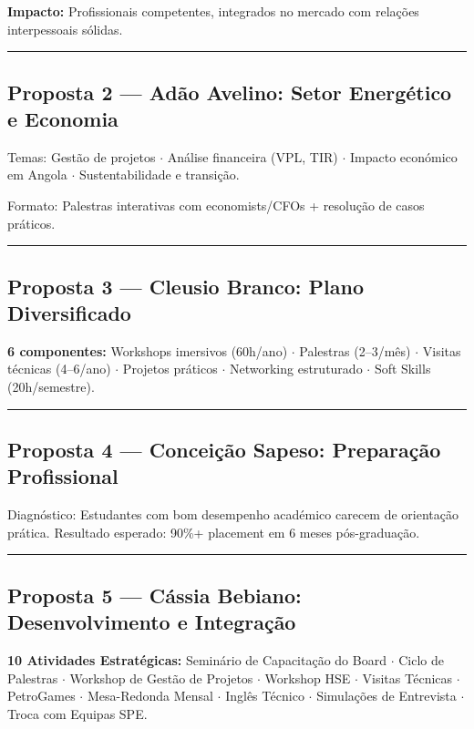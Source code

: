 \documentclass[12pt,a4paper]{article}
\newcommand{\proposalsep}{%
  \vspace{6pt}%
  {\color{gold}\rule{0.35\linewidth}{0.7pt}}%
  \vspace{4pt}%
}
\begin{document}
\begin{infobox}
\small\textbf{Impacto:} Profissionais competentes, integrados no mercado com relações interpessoais sólidas.
\end{infobox}

\proposalsep

\subsection{Proposta 2 — Adão Avelino: Setor Energético e Economia}

Temas: Gestão de projetos $\cdot$ Análise financeira (VPL, TIR) $\cdot$ Impacto económico em Angola $\cdot$ Sustentabilidade e transição.

Formato: Palestras interativas com economists/CFOs + resolução de casos práticos.

\proposalsep

\subsection{Proposta 3 — Cleusio Branco: Plano Diversificado}

\textbf{6 componentes:} Workshops imersivos (60h/ano) $\cdot$ Palestras (2–3/mês) $\cdot$ Visitas técnicas (4–6/ano) $\cdot$ Projetos práticos $\cdot$ Networking estruturado $\cdot$ Soft Skills (20h/semestre).

\proposalsep

\subsection{Proposta 4 — Conceição Sapeso: Preparação Profissional}

Diagnóstico: Estudantes com bom desempenho académico carecem de orientação prática. Resultado esperado: 90\%+ placement em 6 meses pós-graduação.

\proposalsep

\subsection{Proposta 5 — Cássia Bebiano: Desenvolvimento e Integração}

\textbf{10 Atividades Estratégicas:} Seminário de Capacitação do Board $\cdot$ Ciclo de Palestras $\cdot$ Workshop de Gestão de Projetos $\cdot$ Workshop HSE $\cdot$ Visitas Técnicas $\cdot$ PetroGames $\cdot$ Mesa-Redonda Mensal $\cdot$ Inglês Técnico $\cdot$ Simulações de Entrevista $\cdot$ Troca com Equipas SPE.
\end{document}

